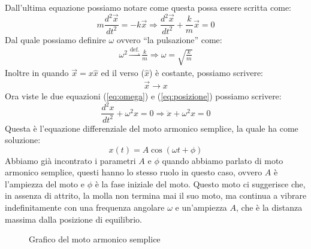         Dall'ultima equazione possiamo notare come questa possa essere scritta come:
        $$
            m\frac{d^2\vec{x}}{dt^2}=-k\vec{x} \Rightarrow \frac{d^2\vec{x}}{dt^2}+\frac{k}{m}\vec{x}=0
        $$
        Dal quale possiamo definire $\omega$ ovvero ``la pulsazione'' come:
        \begin{align}
            \omega^2 \stackrel{\text{def.}}{\rightharpoonup} \frac{k}{m} \Rightarrow \omega = \sqrt{\frac{k}{m}} \label{eq:omega}
        \end{align}
        Inoltre in quando $\vec{x}=x\hat{x}$ ed il verso ($\hat{x}$) è costante, possiamo scrivere:
        \begin{align}
            \vec{x} \longrightarrow x \label{eq:posizione}
        \end{align}
        Ora viste le due equazioni (\ref{eq:omega}) e (\ref{eq:posizione}) possiamo scrivere:
        $$
            \frac{d^2x}{dt^2}+\omega^2 x = 0 \Longrightarrow \ddot{x}+\omega^2 x = 0 
        $$
        Questa è l'equazione differenziale del moto armonico semplice, la quale ha come soluzione:
        $$
            x(t) = A\cos(\omega t + \phi) \label{eq:soluzione}
        $$
        Abbiamo già incontrato i parametri $A$ e $\phi$ quando abbiamo parlato di moto armonico semplice, questi hanno lo stesso ruolo in questo caso, ovvero $A$ è l'ampiezza del moto e $\phi$ è la fase iniziale del moto.\newline
        Questo moto ci suggerisce che, in assenza di attrito, la molla non termina mai il suo moto, ma continua a vibrare indefinitamente con una frequenza angolare $\omega$ e un'ampiezza $A$, che è la distanza massima dalla posizione di equilibrio. 
        \begin{figure}[H]
            \centering
            \caption{Grafico del moto armonico semplice}
            \label{fig:motoArmonicoSemplice}
        \end{figure}
